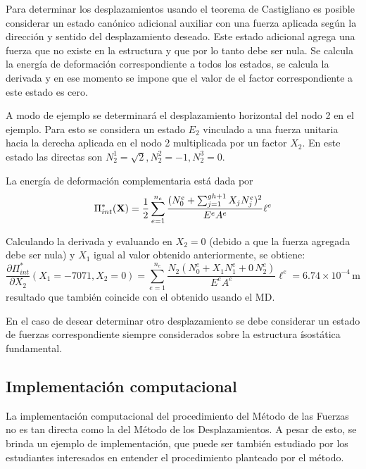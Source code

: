 Para determinar los desplazamientos usando el teorema de Castigliano es posible considerar un estado canónico adicional auxiliar con una fuerza aplicada según la dirección y sentido del desplazamiento deseado. %
%
Este estado adicional agrega una fuerza que no existe en la estructura y que por lo tanto debe ser nula. Se calcula la energía de deformación correspondiente a todos los estados, se calcula la derivada y en ese momento se impone que el valor de el factor correspondiente a este estado es cero.

A modo de ejemplo se determinará el desplazamiento horizontal del nodo 2 en el ejemplo. %
%
Para esto se considera un estado $E_2$ vinculado a una fuerza unitaria hacia la derecha aplicada en el nodo 2 multiplicada por un factor $X_2$. %
%
En este estado las directas son $N_2^1 = \sqrt{2}, N_2^2 = -1, N_2^3 = 0$.


La energía de deformación complementaria está dada por
%
\begin{equation}
\Pi_{int}^*({\bf X}) = \frac{1}{2}  \sum_{e=1}^{n_e} \frac{(N_0^e +   \sum_{j=1}^{gh+1}  X_j N_j^e)^2}{E^e A^e} \ell^e 
\end{equation}

Calculando la derivada y evaluando en $X_2=0$ (debido a que la fuerza agregada debe ser nula) y $X_1$ igual al valor obtenido anteriormente, se obtiene:
\begin{equation}
\frac{\partial \Pi_{int}^*}{\partial X_2} (X_1=-7071,X_2=0) =  \sum_{e=1}^{n_e} \frac{N_2 (N_0^e +  X_1 N_1^e + 0 \, N_2^e  )}{E^e A^e} \ell^e  = 6.74 \times 10^{-4} \, \text{m}
\end{equation}
resultado que también coincide con el obtenido usando el MD.


En el caso de desear determinar otro desplazamiento se debe considerar un estado de fuerzas correspondiente siempre considerados sobre la estructura ísostática fundamental.

\subsection{Implementación computacional}

La implementación computacional del procedimiento del Método de las Fuerzas no es tan directa como la del Método de los Desplazamientos. %
%
A pesar de esto, se brinda un ejemplo de implementación, que puede ser también estudiado por los estudiantes interesados en entender el procedimiento planteado por el método. %

